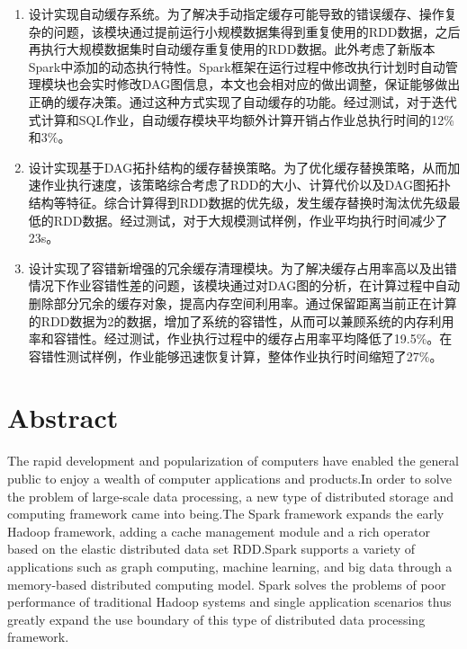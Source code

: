 \begin{enumerate}
    \item 设计实现自动缓存系统。为了解决手动指定缓存可能导致的错误缓存、操作复杂的问题，该模块通过提前运行小规模数据集得到重复使用的RDD数据，之后再执行大规模数据集时自动缓存重复使用的RDD数据。此外考虑了新版本Spark中添加的动态执行特性。Spark框架在运行过程中修改执行计划时自动管理模块也会实时修改DAG图信息，本文也会相对应的做出调整，保证能够做出正确的缓存决策。通过这种方式实现了自动缓存的功能。经过测试，对于迭代式计算和SQL作业，自动缓存模块平均额外计算开销占作业总执行时间的12\%和3\%。
    \item 设计实现基于DAG拓扑结构的缓存替换策略。为了优化缓存替换策略，从而加速作业执行速度，该策略综合考虑了RDD的大小、计算代价以及DAG图拓扑结构等特征。综合计算得到RDD数据的优先级，发生缓存替换时淘汰优先级最低的RDD数据。经过测试，对于大规模测试样例，作业平均执行时间减少了23s。
    \item 设计实现了容错新增强的冗余缓存清理模块。为了解决缓存占用率高以及出错情况下作业容错性差的问题，该模块通过对DAG图的分析，在计算过程中自动删除部分冗余的缓存对象，提高内存空间利用率。通过保留距离当前正在计算的RDD数据为2的数据，增加了系统的容错性，从而可以兼顾系统的内存利用率和容错性。经过测试，作业执行过程中的缓存占用率平均降低了19.5\%。在容错性测试样例，作业能够迅速恢复计算，整体作业执行时间缩短了27\%。
\end{enumerate}

\intobmk\chapter*{Abstract}%

The rapid development and popularization of computers have enabled the general public to enjoy a wealth of computer applications and products.In order to solve the problem of large-scale data processing, a new type of distributed storage and computing framework came into being.The Spark framework expands the early Hadoop framework, adding a cache management module and a rich operator based on the elastic distributed data set RDD.Spark supports a variety of applications such as graph computing, machine learning, and big data through a memory-based distributed computing model. Spark solves the problems of poor performance of traditional Hadoop systems and single application scenarios thus greatly expand the use boundary of this type of distributed data processing framework.

